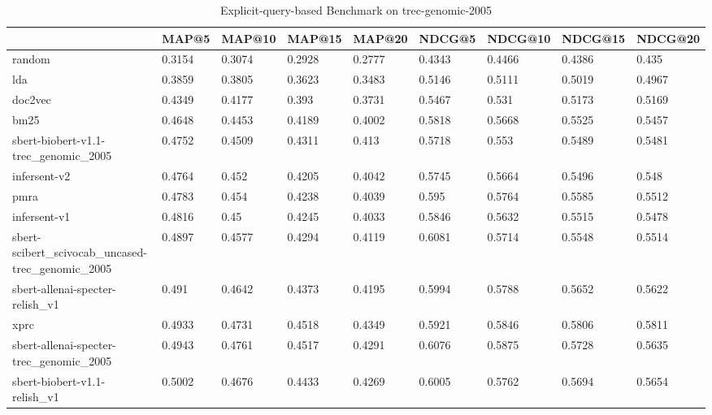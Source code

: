 \begin{table}
\centering
\caption{Explicit-query-based Benchmark on trec-genomic-2005}
\label{tab:query-benchmark-trec-genomic-2005}
\begin{tabular}{lllllllll}
\toprule
{} &    MAP@5 &  MAP@10 &  MAP@15 &  MAP@20 &   NDCG@5 & NDCG@10 & NDCG@15 & NDCG@20 \\
\midrule
random                                           &   0.3154 &  0.3074 &  0.2928 &  0.2777 &   0.4343 &  0.4466 &  0.4386 &   0.435 \\
lda                                              &   0.3859 &  0.3805 &  0.3623 &  0.3483 &   0.5146 &  0.5111 &  0.5019 &  0.4967 \\
doc2vec                                          &   0.4349 &  0.4177 &   0.393 &  0.3731 &   0.5467 &   0.531 &  0.5173 &  0.5169 \\
bm25                                             &   0.4648 &  0.4453 &  0.4189 &  0.4002 &   0.5818 &  0.5668 &  0.5525 &  0.5457 \\
sbert-biobert-v1.1-trec\_genomic\_2005             &   0.4752 &  0.4509 &  0.4311 &   0.413 &   0.5718 &   0.553 &  0.5489 &  0.5481 \\
infersent-v2                                     &   0.4764 &   0.452 &  0.4205 &  0.4042 &   0.5745 &  0.5664 &  0.5496 &   0.548 \\
pmra                                             &   0.4783 &   0.454 &  0.4238 &  0.4039 &    0.595 &  0.5764 &  0.5585 &  0.5512 \\
infersent-v1                                     &   0.4816 &    0.45 &  0.4245 &  0.4033 &   0.5846 &  0.5632 &  0.5515 &  0.5478 \\
sbert-scibert\_scivocab\_uncased-trec\_genomic\_2005 &   0.4897 &  0.4577 &  0.4294 &  0.4119 &   0.6081 &  0.5714 &  0.5548 &  0.5514 \\
sbert-allenai-specter-relish\_v1                  &    0.491 &  0.4642 &  0.4373 &  0.4195 &   0.5994 &  0.5788 &  0.5652 &  0.5622 \\
xprc                                             &   0.4933 &  0.4731 &  0.4518 &  0.4349 &   0.5921 &  0.5846 &  0.5806 &  0.5811 \\
sbert-allenai-specter-trec\_genomic\_2005          &   0.4943 &  0.4761 &  0.4517 &  0.4291 &   0.6076 &  0.5875 &  0.5728 &  0.5635 \\
sbert-biobert-v1.1-relish\_v1                     &   0.5002 &  0.4676 &  0.4433 &  0.4269 &   0.6005 &  0.5762 &  0.5694 &  0.5654 \\

\end{tabular}
\end{table}
